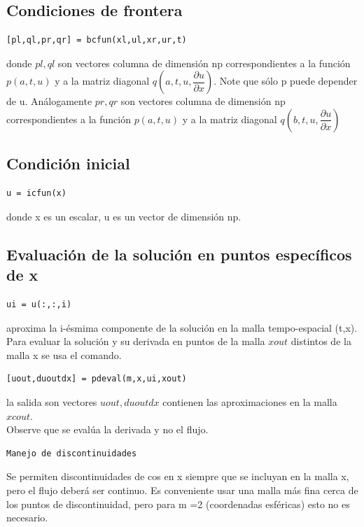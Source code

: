 \documentclass[10pt,a4paper]{article}
\begin{document}
\subsection{Condiciones de frontera} 
\begin{verbatim}
[pl,ql,pr,qr] = bcfun(xl,ul,xr,ur,t)
\end{verbatim}
donde $pl, ql$ son vectores columna de dimensión np correspondientes a la función $p(a,t,u)$ y a la matriz diagonal $q(a,t,u,\dfrac{\partial u}{\partial x})$. Note que sólo p puede depender de u. Análogamente $pr, qr$ son vectores columna de dimensión
np correspondientes a la función $p(a,t,u)$ y a la matriz diagonal $q(b,t,u ,\dfrac{\partial u}{\partial x})$
\subsection{Condición inicial}
\begin{verbatim}
u = icfun(x)
\end{verbatim}
donde x es un escalar, u es un vector de dimensión np. 
\subsection{Evaluación de la solución en puntos específicos de x} 
\begin{verbatim}
ui = u(:,:,i)
\end{verbatim}
aproxima la i-ésmima componente de la solución en la malla tempo-espacial (t,x).\\
Para evaluar la solución y su derivada en puntos de la malla  $xout$ distintos de la malla x se usa el comando.
\begin{verbatim}
[uout,duoutdx] = pdeval(m,x,ui,xout)
\end{verbatim}
la salida son vectores $uout,duoutdx$ contienen las aproximaciones en la malla $xcout$.\\
Observe que se evalúa la derivada y no el flujo. 
\begin{verbatim}
Manejo de discontinuidades
\end{verbatim} 
Se permiten discontinuidades de cos en x siempre que se incluyan en la malla x, pero el
flujo deberá ser continuo. Es conveniente usar una malla más fina cerca de los puntos de
discontinuidad, pero para m =2 (coordenadas esféricas) esto no es necesario. \\
\end{document}
